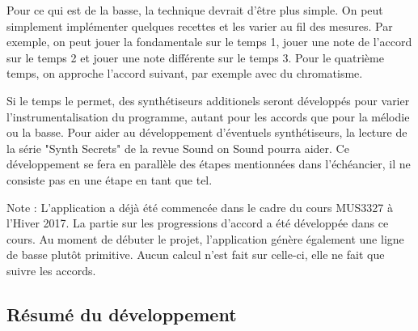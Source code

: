 \documentclass[letterpaper,12pt]{scrartcl}
\begin{document}
Pour ce qui est de la basse, la technique devrait d'être plus simple. On peut simplement implémenter quelques recettes et les varier au fil des mesures. Par exemple, on peut jouer la fondamentale sur le temps 1, jouer une note de l'accord sur le temps 2 et jouer une note différente sur le temps 3. Pour le quatrième temps, on approche l'accord suivant, par exemple avec du chromatisme. 

Si le temps le permet, des synthétiseurs additionels seront développés pour varier l'instrumentalisation du programme, autant pour les accords que pour la mélodie ou la basse. Pour aider au développement d'éventuels synthétiseurs, la lecture de la série "Synth Secrets" de la revue Sound on Sound pourra aider. Ce développement se fera en parallèle des étapes mentionnées dans l'échéancier, il ne consiste pas en une étape en tant que tel. 

Note : L'application a déjà été commencée dans le cadre du cours MUS3327 à l'Hiver 2017. La partie sur les progressions d'accord a été développée dans ce cours. Au moment de débuter le projet, l'application génère également une ligne de basse plutôt primitive. Aucun calcul n'est fait sur celle-ci, elle ne fait que suivre les accords.

	\subsection{Résumé du développement}
	
\end{document}
